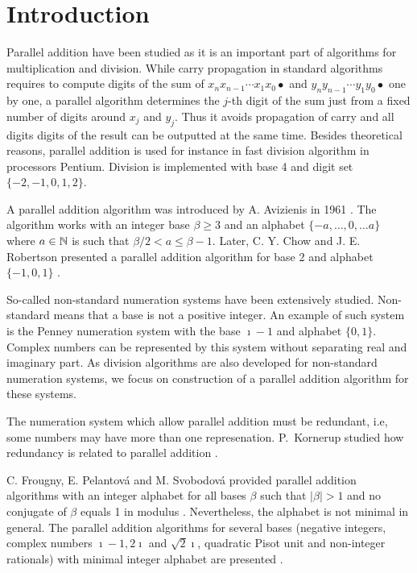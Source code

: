 \cleardoublepage{}
{}
\chapter*{Introduction}

Parallel addition have been studied as it is an important part of algorithms for multiplication and division. 
While carry propagation in standard algorithms requires to compute digits of the sum of $x_n x_{n-1}\cdots x_1 x_0 \bullet$ and $y_n y_{n-1}\cdots y_1 y_0 \bullet$  one by one, a parallel algorithm determines the $j$-th digit of the sum just from a fixed number of digits around $x_j$ and $y_j$. Thus it avoids propagation of carry and all digits digits of the result can be outputted at the same time. Besides theoretical reasons, parallel addition is used for instance in fast division algorithm in processors Pentium. Division is implemented with base 4 and digit set $\{-2,-1,0,1,2\}$.

A parallel addition algorithm  was introduced by A. Avizienis in 1961 \cite{avizienis}. The algorithm works with an integer base $\beta\geq3$ and an alphabet $\{-a, \dots, 0, \dots a\}$ where $a\in\mathbb{N}$ is such that $\beta/2 <a \leq \beta-1$. Later, C. Y. Chow and J. E. Robertson presented a parallel addition algorithm for  base 2 and alphabet $\{-1,0,1\}$ \cite{chow}.

So-called non-standard numeration systems have been extensively studied. Non-standard means that a base is not a positive integer. An example of such system is the Penney numeration system with the base $\imath-1$ and alphabet $\{0,1\}$. Complex numbers can be represented by this system without separating real and imaginary part. As division algorithms are also developed for non-standard numeration systems, we focus on construction of a parallel addition algorithm for these systems.

The numeration system which allow parallel addition must be redundant, i.e, some numbers may have more than one represenation. P.~Kornerup studied how  redundancy is related to parallel addition \cite{kornerup}. 

C. Frougny, E. Pelantov\'a and M. Svobodov\'a provided parallel addition algorithms with an integer alphabet for all bases $\beta$ such that $|\beta|>1$ and no conjugate of $\beta$ equals 1 in modulus \cite{parAddNS}. Nevertheless, the alphabet is not minimal in general.
 The parallel addition algorithms for several bases (negative integers, complex numbers $\imath-1, 2\imath$ and $\sqrt{2}\imath$, quadratic Pisot unit and  non-integer rationals) with minimal integer alphabet are presented \cite{minAlph}.
 
